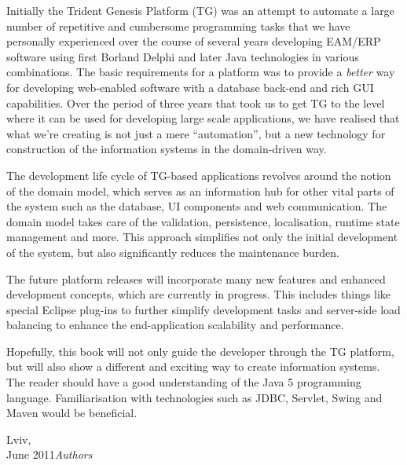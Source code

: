 %
%

\preface
  Initially the Trident Genesis Platform (TG) was an attempt to automate a large number of repetitive and cumbersome programming tasks that we have personally  experienced over the course of several years developing EAM/ERP software using first Borland Delphi and later Java technologies in various combinations.
  The basic requirements for a platform was to provide a \emph{better} way for developing web-enabled software with a database back-end and rich GUI capabilities.
  Over the period of three years that took us to get TG to the level where it can be used for developing large scale applications, we have realised that what we're creating is not just a mere ``automation'', but a new technology for construction of the information systems in the domain-driven way.
  
  The development life cycle of TG-based applications revolves around the notion of the domain model, which serves as an information hub for other vital parts of the system such as the database, UI components and web communication.
  The domain model takes care of the validation, persistence, localisation, runtime state management and more.
  This approach simplifies not only the initial development of the system, but also significantly reduces the maintenance burden.

  The future platform releases will incorporate many new features and enhanced development concepts, which are currently in progress. 
  This includes things like special Eclipse plug-ins to further simplify development tasks and server-side load balancing to enhance the end-application scalability and performance.

  Hopefully, this book will not only guide the developer through the TG platform, but will also show a different and exciting way to create information systems.
  The reader should have a good understanding of the Java 5 programming language. Familiarisation with technologies such as JDBC, Servlet, Swing and Maven would be beneficial.
  
\vspace{\baselineskip}
\begin{flushright}\noindent
Lviv,\hfill ~\\
June 2011\hfill {\it Authors}\\
\end{flushright}


